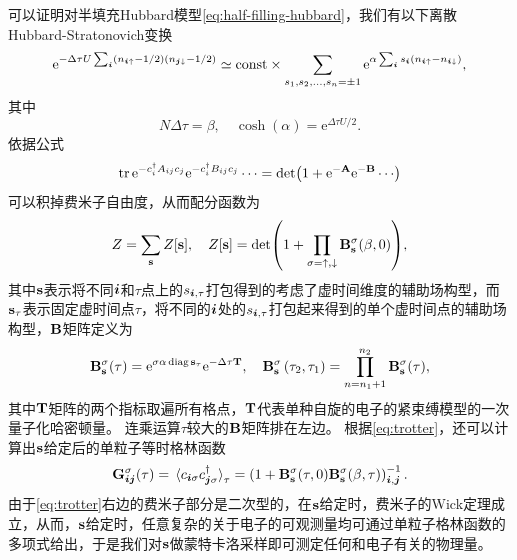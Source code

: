 \documentclass[UTF8]{ctexart}
\DeclareMathOperator{\diag}{diag}
\newcommand*{\ee}{\mathrm{e}}
\begin{document}
可以证明对半填充Hubbard模型\eqref{eq:half-filling-hubbard}，我们有以下离散Hubbard-Stratonovich变换
\begin{equation}
    \ee^{-\Delta \tau U \sum_{\vb*{i}} (n_{\vb*{i} \uparrow} - 1/2) (n_{\vb*{j} \downarrow} - 1/2)} \simeq \text{const} \times \sum_{s_1, s_2, \ldots, s_n = \pm 1} \ee^{\alpha \sum_{\vb*{i}} s_{\vb*{i}} ({n}_{\vb*{i} \uparrow} - {n}_{\vb*{i} \downarrow})},
    \label{eq:trotter}
\end{equation}
其中
\begin{equation}
    N \Delta \tau = \beta, \quad \cosh(\alpha) = \ee^{\Delta \tau U / 2}.
\end{equation}
依据公式
\begin{equation}
    \trace \ee^{- c^\dagger_i A_{ij} c_j} \ee^{- c^\dagger_i B_{ij} c_j} \cdots = \det(1 + \ee^{- \vb{A}} \ee^{- \vb{B}} \cdots)
\end{equation}
可以积掉费米子自由度，从而配分函数为
\begin{equation}
    Z = \sum_{\vb{s}} Z[\vb{s}], \quad Z[\vb{s}] = \det(1 + \prod_{\sigma=\uparrow, \downarrow} \vb{B}_{\vb{s}}^\sigma(\beta, 0) ),
    \label{eq:dqmc-partition-function}
\end{equation}
其中$\vb{s}$表示将不同$\vb*{i}$和$\tau$点上的$s_{\vb*{i}, \tau}$打包得到的考虑了虚时间维度的辅助场构型，而$\vb{s}_\tau$表示固定虚时间点$\tau$，将不同的$\vb*{i}$处的$s_{\vb*{i}, \tau}$打包起来得到的单个虚时间点的辅助场构型，$\vb{B}$矩阵定义为
\begin{equation}
    \vb{B}^{\sigma}_{\vb{s}}(\tau) = \ee^{\sigma \alpha \diag {\vb{s}_\tau}} \ee^{- \Delta \tau \vb{T}}, \quad \mathbf{B}^\sigma_{\mathbf{s}}\left(\tau_{2}, \tau_{1}\right)=\prod_{n=n_{1}+1}^{n_{2}} \vb{B}^{\sigma}_{\vb{s}}(\tau), 
\end{equation}
其中$\vb{T}$矩阵的两个指标取遍所有格点，$\vb{T}$代表单种自旋的电子的紧束缚模型的一次量子化哈密顿量。
连乘运算$\tau$较大的$\vb{B}$矩阵排在左边。
根据\eqref{eq:trotter}，还可以计算出$\vb{s}$给定后的单粒子等时格林函数
\begin{equation}
    \vb{G}^\sigma_{\vb*{i} \vb*{j}}(\tau) = \expval*{c_{\vb*{i} \sigma} c^\dagger_{\vb*{j} \sigma}}_\tau = \left(1+\mathbf{B}^\sigma_{\mathbf{s}}(\tau, 0) \mathbf{B}^\sigma_{\mathbf{s}}(\beta, \tau)\right)^{-1}_{\vb*{i}, \vb*{j}}.
    \label{eq:green-function}
\end{equation}
由于\eqref{eq:trotter}右边的费米子部分是二次型的，在$\vb{s}$给定时，费米子的Wick定理成立，从而，$\vb{s}$给定时，任意复杂的关于电子的可观测量均可通过单粒子格林函数的多项式给出，于是我们对$\vb{s}$做蒙特卡洛采样即可测定任何和电子有关的物理量。
\end{document}
